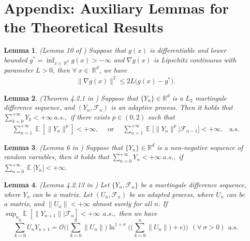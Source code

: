 \documentclass[standalone]{article}
\newtheorem{lem}{Lemma}[section]
\DeclareMathOperator{\Expect}{\mathbb{E}}
\begin{document}
\newpage

\tableofcontents

\newpage


\section{Appendix: Auxiliary Lemmas for the Theoretical Results}\label{sec:lem:appendix}
\begin{lem}\label{loss_bound} (Lemma 10 of \cite{jin2022convergence})
Suppose that $g(x)$ is differentiable and lower bounded $ g^{\ast} = \inf_{x\in \ \mathbb{R}^{d}}g(x) >-\infty$ and $\nabla g(x)$ is Lipschitz continuous with parameter $ L > 0$, then $\forall \ x\in \ \mathbb{R}^{d}$, we have
\begin{align*}
\big\|\nabla g(x)\big\|^{2}\le {2 L}\big(g(x)-g^{*}\big).
\end{align*}
\end{lem}

	\begin{lem} (Theorem 4.2.1 in \cite{Guo2005}) \label{lem_summation_MDS}	
		Suppose that $\{Y_{n}\}\in \mathbb{R}^{d}$ is a $ L_2$ martingale difference sequence, and $(Y_{n},\mathscr{F}_{n})$ is an adaptive process. Then it holds that $\sum_{k=0}^{+\infty}Y_k<+\infty \ a.s.,$ if there exists $p\in (0,2)$ such that 
		\begin{align*}
  \sum_{n=1}^{+\infty}\Expect[\|Y_{n}\|^{p}]<+\infty,	 \quad   \text{ or }  \quad  \sum_{n=1}^{+\infty}\Expect\big[\|Y_{n}\|^{p}\big|\mathscr{F}_{n-1}\big]<+\infty. \quad \text{a.s.}
		\end{align*}
	\end{lem}		
\begin{lem}\label{lem_summation} (Lemma 6 in \cite{jin2022convergence})
Suppose that $\{Y_n\}\in \mathbb{R}^{d}$ is a non-negative sequence of random variables, then it holds that $\sum_{n=0}^{+\infty} Y_n<+\infty \ a.s.,$ if\ $\sum_{n=0}^{+\infty}\Expect\big[Y_n\big]<+\infty.$   	\end{lem}
\begin{lem}\label{Guo_Lei} (Lemma 4.2.13 in \cite{Guo2005}) Let $\{Y_{n},\mathscr{F}_{n}\}$ be a martingale difference sequence, where $Y_n$ can be a matrix. Let $(U_{n},\mathscr{F}_{n})$ be an adapted process, where $U_{n}$ can be a matrix, and $\|U_{n}\|<+\infty$ almost surely for all $n$. If $\sup_{n}\Expect[\|Y_{n+1}\||\mathscr{F}_{n}]<+\infty\ \ a.s.,$ then we have
$$\sum_{k=0}^{n}U_{n}Y_{n+1}=\mathcal{O}\bigg(\bigg(\sum_{k=0}^{n}\|U_{n}\|\bigg)\ln^{1+\sigma}\Bigg(\bigg(\sum_{k=0}^{n}\|U_{n}\|\bigg)+e\Bigg)\Bigg)\ \ (\forall\ \sigma>0)\ \ \text{a.s.}$$
\end{lem}
\end{document}
